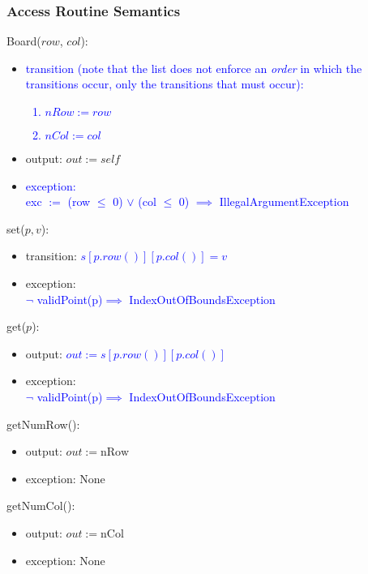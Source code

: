 \documentclass[12pt]{article}
\begin{document}
\subsubsection* {Access Routine Semantics}

Board($row$, $col$):
\begin{itemize}
\item \textcolor{blue}{transition (note that the list does not enforce an \emph{order} in which the transitions occur, only the transitions that must occur): \begin{enumerate} \item $nRow := row$ \item $nCol := col$\end{enumerate}}

\item output: $\mathit{out} := \mathit{self}$
\item \textcolor{blue}{exception: \\
exc $:=$ (row $\leq$ 0) $\lor$ (col $\leq$ 0) $\implies$ IllegalArgumentException}
\end{itemize}

\noindent set($p, v$):
\begin{itemize}
\item transition: \textcolor{blue}{$s[p.row()][p.col()] = v$}
\item exception:\\ \textcolor{blue}{$\lnot$ validPoint(p)$\implies$ IndexOutOfBoundsException}
\end{itemize}

\noindent get($p$):
\begin{itemize}
\item output: \textcolor{blue}{$out := s[p.row()][p.col()]$}
\item exception:\\ \textcolor{blue}{$\lnot$ validPoint(p)$\implies$ IndexOutOfBoundsException}
\end{itemize}

\noindent getNumRow():
\begin{itemize}
\item output: $out := \mbox{nRow}$
\item exception: None
\end{itemize}

\noindent getNumCol():
\begin{itemize}
\item output: $out := \mbox{nCol}$
\item exception: None
\end{itemize}
\end{document}
